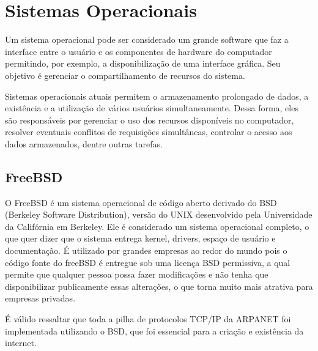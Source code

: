 \section{Sistemas Operacionais}
    
    Um sistema operacional pode ser considerado um grande software que faz a interface entre o usuário e os componentes de hardware do computador permitindo, por exemplo, a disponibilização de uma interface gráfica. Seu objetivo é gerenciar o compartilhamento de recursos do sistema.
      
    Sistemas operacionais atuais permitem o armazenamento prolongado de dados, a existência e a utilização de vários usuários simultaneamente. Dessa forma, eles são responsáveis por gerenciar o uso dos recursos disponíveis no computador, resolver eventuais conflitos de requisições simultâneas, controlar o acesso aos dados armazenados, dentre outras tarefas.

    \subsection{FreeBSD}

        O FreeBSD é um sistema operacional de código aberto derivado do BSD (Berkeley Software Distribution), versão do UNIX desenvolvido pela Universidade da Califórnia em Berkeley. Ele é considerado um sistema operacional completo, o que quer dizer que o sistema entrega kernel, drivers, espaço de usuário e documentação. É utilizado por grandes empresas ao redor do mundo pois o código fonte do freeBSD é entregue sob uma licença BSD permissiva, a qual permite que qualquer pessoa possa fazer modificações e não tenha que disponibilizar publicamente essas alterações, o que torna muito mais atrativa para empresas privadas. %

        É válido ressaltar que toda a pilha de protocolos TCP/IP da ARPANET foi implementada utilizando o BSD, que foi essencial para a criação e existência da internet. %
